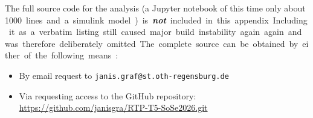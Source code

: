 \documentclass[12pt, oneside, a4paper]{scrreprt}
\begin{document}
                \begin{tcolorbox}[
                    colback=red!10,
                    colframe=red!70!black,
                    title=\textbf{Editorial note — Source code omitted},
                    fonttitle=\bfseries,
                    sharp corners=south,
                ]
                    The full source code for the analysis (a Jupyter notebook of this time only about \qty{1000} lines and a simulink model) is \textbf{\emph{not}} included in this appendix. Including it as a verbatim listing still caused major build instability again again and was therefore deliberately omitted.

                    The complete source can be obtained by either of the following means:
                    \begin{itemize}
                        \item By email request to \texttt{janis.graf@st.oth-regensburg.de}
                        \item Via requesting access to the GitHub repository: \url{https://github.com/janisgra/RTP-T5-SoSe2026.git}
                    \end{itemize}
                \end{tcolorbox}
        
        \printbibliography

\end{document}
